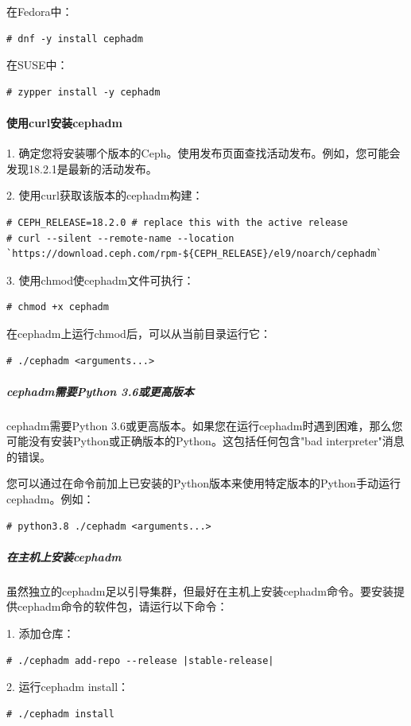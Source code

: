 \documentclass[12pt,UTF8]{ctexbook}
\begin{document}
在Fedora中：
\begin{verbatim}
# dnf -y install cephadm
\end{verbatim}

在SUSE中：
\begin{verbatim}
# zypper install -y cephadm
\end{verbatim}

\paragraph{使用curl安装cephadm}

1. 确定您将安装哪个版本的Ceph。使用发布页面查找活动发布。例如，您可能会发现18.2.1是最新的活动发布。

2. 使用curl获取该版本的cephadm构建：
\begin{verbatim}
# CEPH_RELEASE=18.2.0 # replace this with the active release
# curl --silent --remote-name --location `https://download.ceph.com/rpm-${CEPH_RELEASE}/el9/noarch/cephadm`
\end{verbatim}

3. 使用chmod使cephadm文件可执行：
\begin{verbatim}
# chmod +x cephadm
\end{verbatim}

在cephadm上运行chmod后，可以从当前目录运行它：
\begin{verbatim}
# ./cephadm <arguments...>
\end{verbatim}

\subparagraph{cephadm需要Python 3.6或更高版本}

cephadm需要Python 3.6或更高版本。如果您在运行cephadm时遇到困难，那么您可能没有安装Python或正确版本的Python。这包括任何包含"bad interpreter"消息的错误。

您可以通过在命令前加上已安装的Python版本来使用特定版本的Python手动运行cephadm。例如：
\begin{verbatim}
# python3.8 ./cephadm <arguments...>
\end{verbatim}

\subparagraph{在主机上安装cephadm}

虽然独立的cephadm足以引导集群，但最好在主机上安装cephadm命令。要安装提供cephadm命令的软件包，请运行以下命令：

1. 添加仓库：
\begin{verbatim}
# ./cephadm add-repo --release |stable-release|
\end{verbatim}

2. 运行cephadm install：
\begin{verbatim}
# ./cephadm install
\end{verbatim}
\end{document}
